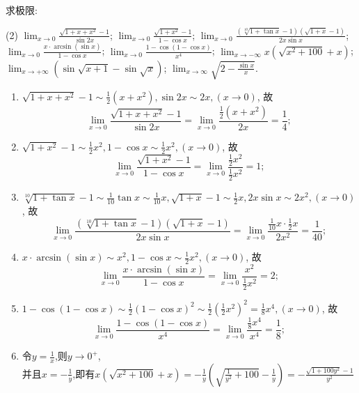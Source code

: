 \begin{exercise}[2.1.17]
    求极限:
    \begin{tasks}[label=(\arabic*)](2)
        \task $\lim_{x \to 0} \frac{\sqrt{1+x+x^2}-1}{\sin 2x}$;
        \task $\lim_{x \to 0} \frac{\sqrt{1+x^2}-1}{1-\cos x}$;
        \task $\lim_{x \to 0} \frac{(\sqrt[10]{1+\tan x}-1)(\sqrt{1+x}-1)}{2x\sin x}$;
        \task $\lim_{x \to 0} \frac{x \cdot \arcsin(\sin x)}{1-\cos x}$;
        \task $\lim_{x \to 0} \frac{1-\cos(1-\cos x)}{x^4}$;
        \task $\lim_{x \to -\infty} x(\sqrt{x^2+100}+x)$;
        \task $\lim_{x \to +\infty} (\sin\sqrt{x+1}-\sin\sqrt{x})$;
        \task $\lim_{x \to \infty} \sqrt{2-\frac{\sin x}{x}}$.
    \end{tasks}
\end{exercise}

\begin{solution}
    \begin{enumerate}
        \item $\sqrt{1+x+x^2}-1 \sim \frac{1}{2}(x+x^2) , \sin 2x \sim 2x,(x\to0)$, 故 $$\lim_{x \to 0} \frac{\sqrt{1+x+x^2}-1}{\sin 2x} = \lim_{x \to 0} \frac{\frac{1}{2}(x+x^2)}{2x} = \frac{1}{4};$$
        \item $\sqrt{1+x^2}-1 \sim \frac{1}{2}x^2 , 1-\cos x \sim \frac{1}{2}x^2,(x\to0)$, 故 $$\lim_{x \to 0} \frac{\sqrt{1+x^2}-1}{1-\cos x} = \lim_{x \to 0} \frac{\frac{1}{2}x^2}{\frac{1}{2}x^2} = 1;$$
        \item $\sqrt[10]{1+\tan x}-1 \sim \frac{1}{10}\tan x \sim \frac{1}{10}x , \sqrt{1+x}-1 \sim \frac{1}{2}x , 2x\sin x \sim 2x^2,(x\to0)$, 故 $$\lim_{x \to 0} \frac{(\sqrt[10]{1+\tan x}-1)(\sqrt{1+x}-1)}{2x\sin x} = \lim_{x \to 0} \frac{\frac{1}{10}x \cdot \frac{1}{2}x}{2x^2} = \frac{1}{40};$$
        \item $x \cdot \arcsin(\sin x) \sim x^2 , 1-\cos x \sim \frac{1}{2}x^2,(x\to0)$, 故 $$\lim_{x \to 0} \frac{x \cdot \arcsin(\sin x)}{1-\cos x} = \lim_{x \to 0} \frac{x^2}{\frac{1}{2}x^2} = 2;$$
        \item $1-\cos(1-\cos x) \sim \frac{1}{2}(1-\cos x)^2 \sim \frac{1}{2} \left( \frac{1}{2}x^2 \right)^2 = \frac{1}{8}x^4,(x\to0)$, 故 $$\lim_{x \to 0} \frac{1-\cos(1-\cos x)}{x^4} = \lim_{x \to 0} \frac{\frac{1}{8}x^4}{x^4} = \frac{1}{8};$$
        \item 令$y=\frac{1}{x}$,则$y\to 0^+$,\\
        并且$x=-\frac{1}{y}$,即有$x(\sqrt{x^2+100}+x)=-\frac{1}{y}\left(\sqrt{\frac{1}{y^2}+100}-\frac{1}{y}\right)=-\frac{\sqrt{1+100y^2}-1}{y^2}$\\

\end{enumerate}
\end{solution}
